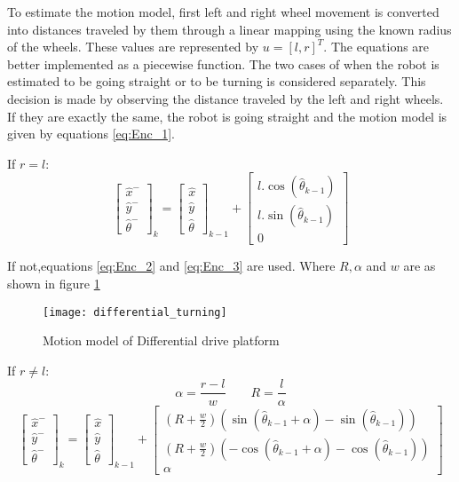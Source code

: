 To estimate the motion model, first left and right wheel movement is converted into distances traveled by them through a linear mapping using the known radius of the wheels. These values are represented by $ u = [ l, r ]^T $. The equations are better implemented as a piecewise function. The two cases of when the robot is estimated to be going straight or to be turning is considered separately. This decision is made by observing the distance traveled by the left and right wheels. If they are exactly the same, the robot is going straight and the motion model is given by equations \ref{eq:Enc_1}. 

If $ r = l $:
\begin{equation}
\label{eq:Enc_1}
	\begin{bmatrix}
		\hat{x}^-\\\hat{y}^-\\\hat{\theta}^-
	\end{bmatrix}_k
	=
	\begin{bmatrix}
		\hat{x}\\\hat{y}\\\hat{\theta}
	\end{bmatrix}_{k-1}
	+
	\begin{bmatrix}
		l.\cos(\hat{\theta}_{k-1})\\
		l.\sin(\hat{\theta}_{k-1})\\
		0
	\end{bmatrix}
\end{equation}	

If not,equations \ref{eq:Enc_2} and \ref{eq:Enc_3} are used. Where $ R,\alpha $ and $ w $ are as shown in figure \ref{fig:Enc_1}
			
\begin{figure}
\centering
\texttt{[image: differential\_turning]}
\caption{Motion model of Differential drive platform}
\label{fig:Enc_1}
\end{figure}
If $ r \neq l $:
\begin{equation}
\label{eq:Enc_2}
	\alpha= \frac{r-l}{w}
\qquad
	R=\frac{l}{\alpha}
\end{equation}
\begin{equation}
\label{eq:Enc_3}
	\begin{bmatrix}
		\hat{x}^-\\\hat{y}^-\\\hat{\theta}^-
	\end{bmatrix}_k
	=
	\begin{bmatrix}
		\hat{x}\\\hat{y}\\\hat{\theta}
	\end{bmatrix}_{k-1}
	+
	\begin{bmatrix}
		\left(R+\frac{w}{2}\right)(\sin(\hat{\theta}_{k-1}+\alpha)-\sin(\hat{\theta}_{k-1}))\\
		\left(R+\frac{w}{2}\right)(-\cos(\hat{\theta}_{k-1}+\alpha)-\cos(\hat{\theta}_{k-1}))\\
		\alpha
	\end{bmatrix}
\end{equation}

